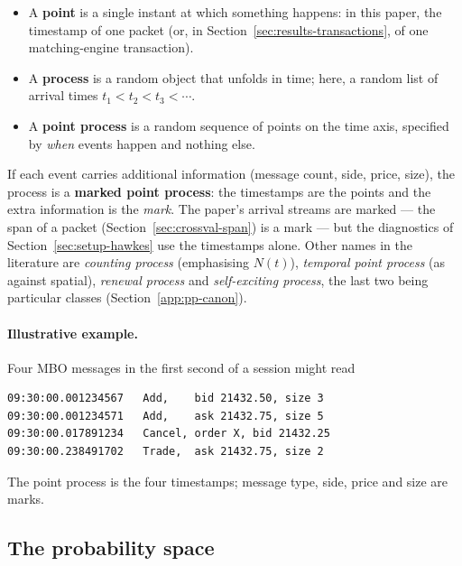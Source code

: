 \begin{itemize}
    \item A \textbf{point} is a single instant at which something happens: in this paper,
the timestamp of one packet (or, in Section~\ref{sec:results-transactions}, of one
matching-engine transaction).
    \item A \textbf{process} is a random object that unfolds in time; here, a random list
of arrival times $t_1 < t_2 < t_3 < \cdots$.
    \item A \textbf{point process} is a random sequence of points on the time axis,
specified by \emph{when} events happen and nothing else.
\end{itemize}
If each event carries additional information (message count, side, price, size), the
process is a \textbf{marked point process}: the timestamps are the points and the extra
information is the \emph{mark}. The paper's arrival streams are marked --- the span of a
packet (Section~\ref{sec:crossval-span}) is a mark --- but the diagnostics of
Section~\ref{sec:setup-hawkes} use the timestamps alone. Other names in the literature
are \emph{counting process} (emphasising $N(t)$), \emph{temporal point process} (as
against spatial), \emph{renewal process} and \emph{self-exciting process}, the last two
being particular classes (Section~\ref{app:pp-canon}).

\paragraph{Illustrative example.} Four MBO messages in the first second of a session
might read
\begin{verbatim}
09:30:00.001234567   Add,    bid 21432.50, size 3
09:30:00.001234571   Add,    ask 21432.75, size 5
09:30:00.017891234   Cancel, order X, bid 21432.25
09:30:00.238491702   Trade,  ask 21432.75, size 2
\end{verbatim}
The point process is the four timestamps; message type, side, price and size are marks.

\subsection{The probability space}
\label{app:pp-probspace}

